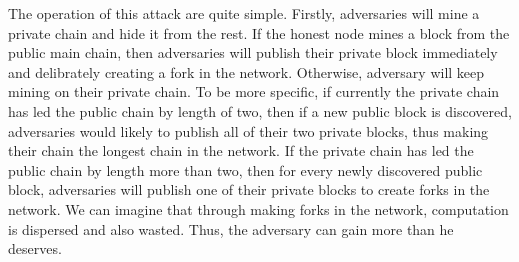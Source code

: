 \documentclass{llncs}
\begin{document}
The operation of this attack are quite simple. Firstly, adversaries will mine a private chain and hide it from the rest. If the honest node mines a block from the public main chain, then adversaries will publish their private block immediately and delibrately creating a fork in the network. Otherwise, adversary will keep mining on their private chain. To be more specific, if currently the private chain has led the public chain by length of two, then if a new public block is discovered, adversaries would likely to publish all of their two private blocks, thus making their chain the longest chain in the network. If the private chain has led the public chain by length more than two, then for every newly discovered public block, adversaries will publish one of their private blocks to create forks in the network. We can imagine that through making forks in the network, computation is dispersed and also wasted. Thus, the adversary can gain more than he deserves.
\vspace{-7mm}
\end{document}
